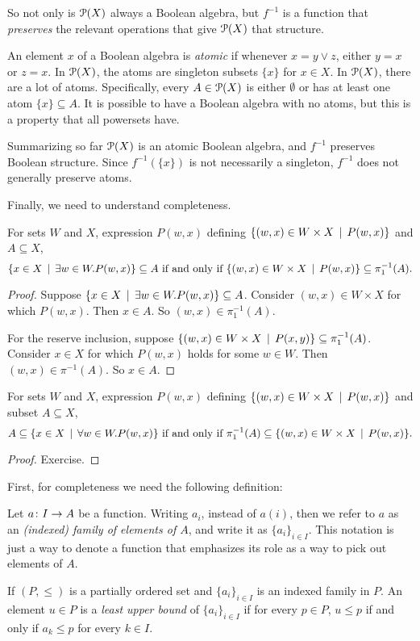 So not only is ${\mathcal{P}}(X)$ always a Boolean algebra, but $f^{-1}$ is a function that \emph{preserves} the relevant operations that give ${\mathcal{P}}(X)$ that structure.

An element $x$ of a Boolean algebra is \emph{atomic} if whenever $x = y\vee z$,
either $y=x$ or $z=x$. In ${\mathcal{P}}(X)$, the atoms are singleton subsets $\{x\}$
for $x\in X$. In ${\mathcal{P}}(X)$, there are a lot of atoms. Specifically, 
every $A\in{\mathcal{P}}(X)$ is either $\emptyset$ or has at least one atom $\{x\}\subseteq A$. It is possible to have a Boolean algebra with no atoms, but this is a property that all powersets have.

Summarizing so far ${\mathcal{P}}(X)$ is an atomic Boolean algebra, and $f^{-1}$ preserves Boolean structure. Since $f^{-1}(\{x\})$ is not necessarily a singleton,
$f^{-1}$ does not generally preserve atoms.

Finally, we need to understand completeness.

\begin{lemma}
	For sets $W$ and $X$, expression $P(w,x)$ defining $\{(w,x)\in W\times X\,\mid\, P(w,x)\}$ and $A\subseteq X$,
	\[\text{$\{x\in X\,\mid\, \exists w\in W.P(w,x)\} \subseteq A$ if and only if $\{(w,x)\in W\times X\,\mid\, P(w,x)\} \subseteq \pi_1^{-1}(A)$.}\] 
	 
	\begin{proof}
		Suppose $\{x\in X\,\mid\, \exists w\in W.P(w,x)\}\subseteq A$.
		Consider $(w,x)\in W\times X$ for which $P(w,x)$.
		Then $x\in A$. So $(w,x)\in \pi_1^{-1}(A)$. 
		
		For the reserve inclusion, suppose $\{(w,x)\in W\times X\,\mid\, P(x,y)\}\subseteq \pi_1^{-1}(A)$.
		Consider $x\in X$ for which $P(w,x)$ holds for some $w\in W$.
		Then $(w,x)\in \pi^{-1}(A)$.
		So $x\in A$.
	\end{proof}
\end{lemma}

\begin{lemma}
		For sets $W$ and $X$, expression $P(w,x)$ defining $\{(w,x)\in W\times X\,\mid\, P(w,x)\}$ and subset $A\subseteq X$,
		\[\text{$A\subseteq \{x\in X\,\mid\, \forall w\in W.P(w,x)\}$ if and only if 
		$\pi_1^{-1}(A)\subseteq \{(w,x)\in W\times X\,\mid\, P(w,x)\}$.}\]
		
		\begin{proof}
			Exercise.
		\end{proof} 	
\end{lemma}

First, for completeness we need the following definition:
\begin{defn}
	Let ${a}\colon{I}\to{A}$ be a function. Writing $a_i$,
	instead of $a(i)$, then we refer to $a$ as an \emph{(indexed) family of elements of $A$}, and write it as $\{a_i\}_{i\in I}$. This notation is just a way to denote a function that emphasizes its role as a way to pick out elements of $A$.
	
	If $(P,\leq)$ is a partially ordered set and $\{a_i\}_{i\in I}$ is an indexed family in $P$. An element $u\in P$ is a \emph{least upper bound} of $\{a_i\}_{i\in I}$ if for every $p\in P$, $u\leq p$ if and only if $a_k\leq p$ 
	for every $k\in I$. 
\end{defn}

